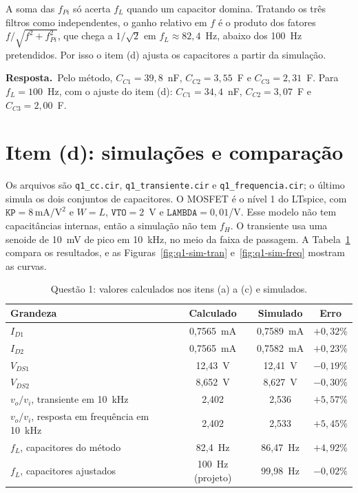 \documentclass[12pt,a4paper]{report}
\newcommand{\un}[1]{\,\mathrm{#1}}
\newcommand{\resposta}{\par\smallskip\noindent\textbf{Resposta.}\ }
\begin{document}
A soma das $f_{Pi}$ só acerta $f_L$ quando um capacitor domina. Tratando os três filtros como independentes, o ganho relativo em $f$ é o produto dos fatores $f/\sqrt{f^2+f_{Pi}^2}$, que chega a $1/\sqrt2$ em $f_L\approx82{,}4$~Hz, abaixo dos 100~Hz pretendidos. Por isso o item (d) ajusta os capacitores a partir da simulação.

\resposta Pelo método, $C_{C1} = 39{,}8$~nF, $C_{C2} = 3{,}55$~\textmu F e $C_{C3} = 2{,}31$~\textmu F. Para $f_L = 100$~Hz, com o ajuste do item (d): $C_{C1} = 34{,}4$~nF, $C_{C2} = 3{,}07$~\textmu F e $C_{C3} = 2{,}00$~\textmu F.

\section{Item (d): simulações e comparação}

Os arquivos são \texttt{q1\_cc.cir}, \texttt{q1\_transiente.cir} e \texttt{q1\_frequencia.cir}; o último simula os dois conjuntos de capacitores. O MOSFET é o nível 1 do LTspice, com $\texttt{KP} = 8\un{mA/V^2}$ e $W = L$, $\texttt{VTO} = 2$~V e $\texttt{LAMBDA} = 0{,}01$/V. Esse modelo não tem capacitâncias internas, então a simulação não tem $f_H$. O transiente usa uma senoide de 10~mV de pico em 10~kHz, no meio da faixa de passagem. A Tabela~\ref{tab:q1-sim} compara os resultados, e as Figuras~\ref{fig:q1-sim-tran} e~\ref{fig:q1-sim-freq} mostram as curvas.

\begin{table}[H]
\centering
\caption{Questão 1: valores calculados nos itens (a) a (c) e simulados.}
\label{tab:q1-sim}
\begin{tabular}{lccc}
\toprule
Grandeza & Calculado & Simulado & Erro \\
\midrule
$I_{D1}$ & 0,7565~mA & 0,7589~mA & $+0{,}32\%$ \\
$I_{D2}$ & 0,7565~mA & 0,7582~mA & $+0{,}23\%$ \\
$V_{DS1}$ & 12,43~V & 12,41~V & $-0{,}19\%$ \\
$V_{DS2}$ & 8,652~V & 8,627~V & $-0{,}30\%$ \\
$v_o/v_i$, transiente em 10~kHz & 2,402 & 2,536 & $+5{,}57\%$ \\
$v_o/v_i$, resposta em frequência em 10~kHz & 2,402 & 2,533 & $+5{,}45\%$ \\
$f_L$, capacitores do método & 82,4~Hz & 86,47~Hz & $+4{,}92\%$ \\
$f_L$, capacitores ajustados & 100~Hz (projeto) & 99,98~Hz & $-0{,}02\%$ \\
\bottomrule
\end{tabular}
\end{table}
\end{document}
